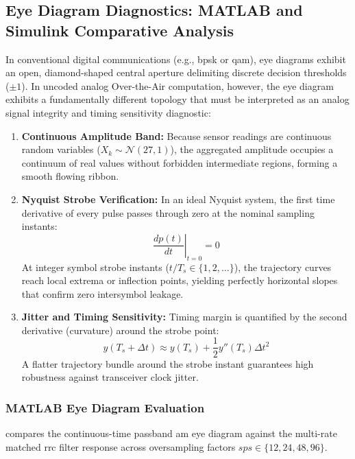 \documentclass[Markos_Delaportas_1316.tex]{subfiles}
\begin{document}
\subsection{Eye Diagram Diagnostics: MATLAB and Simulink Comparative Analysis}
\label{subsec:eye_diagram_diagnostics}
In conventional digital communications (e.g., \gls{bpsk} or
\gls{qam}), eye diagrams exhibit an open, diamond-shaped central aperture
delimiting discrete decision thresholds ($\pm 1$). In uncoded analog
Over-the-Air computation, however, the eye diagram exhibits a
fundamentally different topology that must be interpreted as an
analog signal integrity and timing sensitivity diagnostic:
\begin{enumerate}
    \item \textbf{Continuous Amplitude Band:} Because sensor readings
        are continuous random variables ($X_k \sim \mathcal{N}(27, 1)$),
        the aggregated amplitude occupies a continuum of real values
        without forbidden intermediate regions, forming a smooth flowing ribbon.
    \item \textbf{Nyquist Strobe Verification:} In an ideal Nyquist
        system, the first time derivative of every pulse passes through
        zero at the nominal sampling instants:
        \begin{equation}
            \left. \frac{d p(t)}{dt} \right\vert_{t = 0} = 0
            \label{eq:nyquist_derivative}
        \end{equation}
        At integer symbol strobe instants ($t / T_s \in \{1, 2,
        \dots\}$), the trajectory curves reach local extrema or
        inflection points,
        yielding perfectly horizontal slopes that confirm zero
        intersymbol leakage.
    \item \textbf{Jitter and Timing Sensitivity:} Timing margin is
        quantified by the second derivative (curvature) around the strobe point:
        \begin{equation}
            y(T_s + \Delta t) \approx y(T_s) + \frac{1}{2} y''(T_s) \Delta t^2
            \label{eq:strobe_instant_curvature}
        \end{equation}
        A flatter trajectory bundle around the strobe instant
        guarantees high robustness against transceiver clock jitter.
\end{enumerate}

\subsubsection{MATLAB Eye Diagram Evaluation}
\label{subsubsec:matlab_eye_diagrams}
 compares the continuous-time passband
\gls{am} eye diagram against the multi-rate matched \gls{rrc}
filter response across oversampling factors $sps \in \{12, 24, 48, 96\}$.
\end{document}
